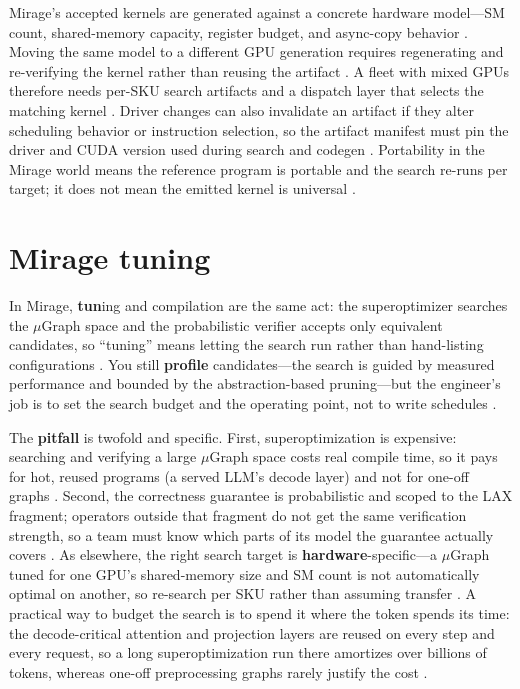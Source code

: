 Mirage's accepted kernels are generated against a concrete hardware model---SM count, shared-memory capacity, register budget, and async-copy behavior \citep{wu2024mirage,nvidia2022hopper}. Moving the same model to a different GPU generation requires regenerating and re-verifying the kernel rather than reusing the artifact \citep{wu2024mirage,patel2025llminference}. A fleet with mixed GPUs therefore needs per-SKU search artifacts and a dispatch layer that selects the matching kernel \citep{kwon2023vllm,taxbreak2026}. Driver changes can also invalidate an artifact if they alter scheduling behavior or instruction selection, so the artifact manifest must pin the driver and CUDA version used during search and codegen \citep{chen2020compilerbasedhardw,memoryfloor2026}. Portability in the Mirage world means the reference program is portable and the search re-runs per target; it does not mean the emitted kernel is universal \citep{wu2024mirage,nvidia2022hopper}.

\section{Mirage tuning}
\label{sec:ch20_mirage_tuning}

In Mirage, \textbf{tun}ing and compilation are the same act: the superoptimizer searches the $\mu$Graph space and the probabilistic verifier accepts only equivalent candidates, so ``tuning'' means letting the search run rather than hand-listing configurations \citep{wu2024mirage}. You still \textbf{profile} candidates---the search is guided by measured performance and bounded by the abstraction-based pruning---but the engineer's job is to set the search budget and the operating point, not to write schedules \citep{wu2024mirage}.

The \textbf{pitfall} is twofold and specific. First, superoptimization is expensive: searching and verifying a large $\mu$Graph space costs real compile time, so it pays for hot, reused programs (a served LLM's decode layer) and not for one-off graphs \citep{wu2024mirage,kwon2023vllm}. Second, the correctness guarantee is probabilistic and scoped to the LAX fragment; operators outside that fragment do not get the same verification strength, so a team must know which parts of its model the guarantee actually covers \citep{wu2024mirage}. As elsewhere, the right search target is \textbf{hardware}-specific---a $\mu$Graph tuned for one GPU's shared-memory size and SM count is not automatically optimal on another, so re-search per SKU rather than assuming transfer \citep{nvidia2022hopper,patel2025llminference}. A practical way to budget the search is to spend it where the token spends its time: the decode-critical attention and projection layers are reused on every step and every request, so a long superoptimization run there amortizes over billions of tokens, whereas one-off preprocessing graphs rarely justify the cost \citep{wu2024mirage,kwon2023vllm}.

